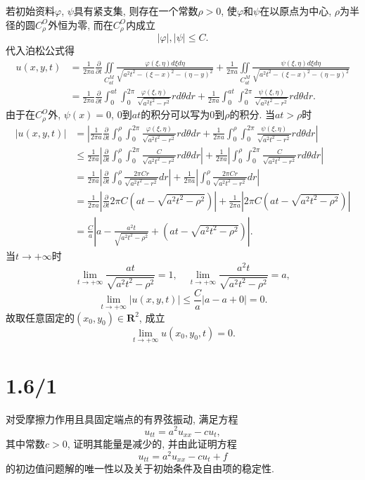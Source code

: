 \documentclass[11pt,a4paper]{article}
\begin{document}
若初始资料$\varphi$, $\psi$具有紧支集, 则存在一个常数$\rho>0$, 使$\varphi$和$\psi$在以原点为中心, $\rho$为半径的圆$C_\rho^O$外恒为零, 而在$C_\rho^O$内成立
$$|\varphi|,|\psi|\leqslant C.$$
代入泊松公式得
\begin{align*}
  u(x,y,t)
   & =\frac{1}{2\pi a}\frac{\partial}{\partial t}\iint\limits_{C_{at}^M}\frac{\varphi(\xi,\eta)d\xi d\eta}{\sqrt{a^2t^2-(\xi-x)^2-(\eta-y)^2}}+
  \frac{1}{2\pi a}\iint\limits_{C_{at}^M}\frac{\psi(\xi,\eta)d\xi d\eta}{\sqrt{a^2t^2-(\xi-x)^2-(\eta-y)^2}}                                                 \\
   & =\frac{1}{2\pi a}\frac{\partial}{\partial t}\int_0^{at}\int_0^{2\pi}\frac{\varphi(\xi,\eta)}{\sqrt{a^2t^2-r^2}}rd\theta dr+
  \frac{1}{2\pi a}\int_0^{at}\int_0^{2\pi}\frac{\psi(\xi,\eta)}{\sqrt{a^2t^2-r^2}}rd\theta dr.
\end{align*}
由于在$C_\rho^O$外, $\psi(x)=0$, $0$到$at$的积分可以写为$0$到$\rho$的积分. 当$at>\rho$时
\begin{align*}
  |u(x,y,t)|
   & =\left|\frac{1}{2\pi a}\frac{\partial}{\partial t}\int_0^{\rho}\int_0^{2\pi}\frac{\varphi(\xi,\eta)}{\sqrt{a^2t^2-r^2}}rd\theta dr+
  \frac{1}{2\pi a}\int_0^{\rho}\int_0^{2\pi}\frac{\psi(\xi,\eta)}{\sqrt{a^2t^2-r^2}}rd\theta dr\right|\\
  &\leqslant\frac{1}{2\pi a}\left|\frac{\partial}{\partial t}\int_0^{\rho}\int_0^{2\pi}\frac{C}{\sqrt{a^2t^2-r^2}}rd\theta dr\right|+
   \frac{1}{2\pi a}\left|\int_0^{\rho}\int_0^{2\pi}\frac{C}{\sqrt{a^2t^2-r^2}}rd\theta dr \right|\\
   &=\frac{1}{2\pi a}\left|\frac{\partial}{\partial t}\int_0^{\rho}\frac{2\pi Cr}{\sqrt{a^2t^2-r^2}}dr\right|+
    \frac{1}{2\pi a}\left|\int_0^{\rho}\frac{2\pi Cr}{\sqrt{a^2t^2-r^2}}dr \right|\\
    &=\frac{1}{2\pi a}\left|\frac{\partial}{\partial t}2\pi C\left(at-\sqrt{a^2t^2-\rho^2}\right)\right|+\frac{1}{2\pi a}\left|2\pi C\left(at-\sqrt{a^2t^2-\rho^2}\right)\right|\\
    &=\frac{C}{a}\left|a-\frac{a^2t}{\sqrt{a^2t^2-\rho^2}}+\left(at-\sqrt{a^2t^2-\rho^2}\right)\right|.
\end{align*}
当$t\to+\infty$时
$$\lim_{t\to+\infty}\frac{at}{\sqrt{a^2t^2-\rho^2}}=1,\quad \lim_{t\to+\infty}\frac{a^2t}{\sqrt{a^2t^2-\rho^2}}=a,$$
$$\lim_{t\to+\infty}|u(x,y,t)|\leqslant \frac{C}{a}|a-a+0|=0.$$
故取任意固定的$(x_0,y_0)\in \mathbf{R}^2$, 成立
$$\lim_{t\to+\infty} u(x_0,y_0,t)=0.$$

\section{1.6/1}
\begin{problem}
  对受摩擦力作用且具固定端点的有界弦振动, 满足方程
  $$u_{tt}=a^2u_{xx}-cu_t,$$
  其中常数$c>0$, 证明其能量是减少的, 并由此证明方程
  $$u_{tt}=a^2u_{xx}-cu_t+f$$
  的初边值问题解的唯一性以及关于初始条件及自由项的稳定性.
\end{problem}
\end{document}

